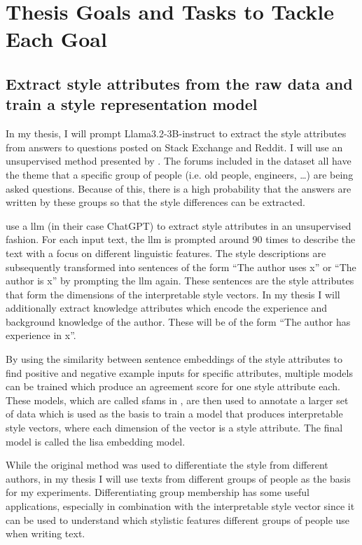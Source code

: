 
\section{Thesis Goals and Tasks to Tackle Each Goal}
\subsection{Extract style attributes from the raw data and train a style representation model}
In my thesis, I will prompt Llama3.2-3B-instruct %
to extract the style attributes from answers to questions posted on Stack Exchange and Reddit. I will use an unsupervised method presented by \citet{patelLearningInterpretableStyle2023}. The forums included in the dataset all have the theme that a specific group of people (i.e. old people, engineers, \ldots) are being asked questions. Because of this, there is a high probability that the answers are written by these groups so that the style differences can be extracted.

\citeauthor{patelLearningInterpretableStyle2023} use a \acl{llm} (in their case ChatGPT) to extract style attributes in an unsupervised fashion. For each input text, the \ac{llm} is prompted around 90 times to describe the text with a focus on different linguistic features. The style descriptions are subsequently transformed into sentences of the form \enquote{The author uses x} or \enquote{The author is x} by prompting the \ac{llm} again. These sentences are the style attributes that form the dimensions of the interpretable style vectors. In my thesis I will additionally extract knowledge attributes which encode the experience and background knowledge of the author. These will be of the form \enquote{The author has experience in x}.

By using the similarity between sentence embeddings of the style attributes to find positive and negative example inputs for specific attributes, multiple models can be trained which produce an agreement score for one style attribute each. These models, which are called \acp{sfam} in \citet{patelLearningInterpretableStyle2023}, are then used to annotate a larger set of data which is used as the basis to train a model that produces interpretable style vectors, where each dimension of the vector is a style attribute. The final model is called the \ac{lisa} embedding model.

While the original method was used to differentiate the style from different authors, in my thesis I will use texts from different groups of people as the basis for my experiments. Differentiating group membership has some useful applications, especially in combination with the interpretable style vector since it can be used to understand which stylistic features different groups of people use when writing text. %

